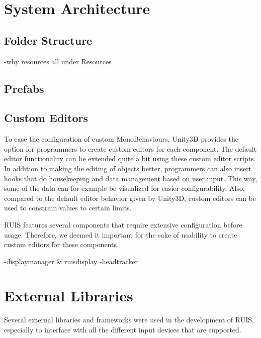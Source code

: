 \documentclass[12pt,a4paper,oneside,pdftex]{report}
\begin{document}
\section{System Architecture}
\label{section:systemarchitecture}

\subsection{Folder Structure}
\label{subsection:systemarchitecture:folderstructure}

-why resources all under Resources

\subsection{Prefabs}
\label{subsection:systemarchitecture:prefabs}



\subsection{Custom Editors}
\label{subsection:systemarchitecture:customeditors}

To ease the configuration of custom MonoBehaviours, Unity3D provides the option for programmers to create custom editors for each component. The default editor functionality can be extended quite a bit using these custom editor scripts. In addition to making the editing of objects better, programmers can also insert hooks that do housekeeping and data management based on user input. This way, some of the data can for example be visualized for easier configurability. Also, compared to the default editor behavior given by Unity3D, custom editors can be used to constrain values to certain limits.

RUIS features several components that require extensive configuration before usage. Therefore, we deemed it important for the sake of usability to create custom editors for these components. 

-displaymanager & ruisdisplay
-headtracker


\section{External Libraries}
\label{section:externallibraries}

Several external libraries and frameworks were used in the development of RUIS, especially to interface with all the different input devices that are supported. 
\end{document}

